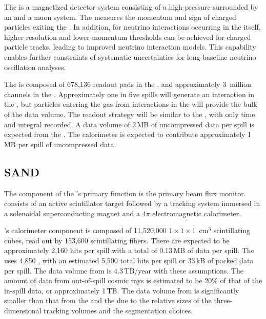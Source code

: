 \documentclass[../main-v1.tex]{subfiles}
\begin{document}
The  is a magnetized detector system consisting of a high-pressure  surrounded by an  and a muon system. The  measures the momentum and sign of charged particles exiting the . In addition, for neutrino interactions occurring in the  itself, higher resolution and lower momentum thresholds can be achieved for charged particle tracks, leading to improved neutrino interaction models. This capability enables further constraints of systematic uncertainties for long-baseline neutrino  oscillation analyses.

The  is composed of 678,136 readout pads in the , and approximately 3~million channels in the .  Approximately one in five spills will generate an interaction in the , but particles entering the gas from interactions in the  will provide the bulk of the data volume.  The readout strategy will be similar to the , with only time and integral recorded. A  data volume of 2\,MB of uncompressed data per spill is expected from the .  The calorimeter is expected to contribute approximately 1\,MB per spill of uncompressed data.


\subsection{SAND }
\label{sec:comp-dataestimates-sand}

The  component of the 's primary function is the primary beam flux monitor.    consists of an active scintillator target  followed by a tracking system immersed in a solenoidal superconducting magnet  and  a $4\pi$ electromagnetic calorimeter.


's  calorimeter component is composed of 11,520,000 $1\times 1\times 1$~cm$^3$ scintillating cubes, read out by 153,600 scintillating fibers.  There are expected to be approximately 2,160 hits per spill with a total of 0.13\,MB of data per spill.  The  ~\cite{Adinolfi:2002zx} uses 4,850 , with an estimated 5,500 total hits per spill or 33\,kB of packed data per spill.   The data volume from  is 4.3\,TB/year with these assumptions.  The amount of data from out-of-spill cosmic rays is estimated to be 20\% of that of the in-spill data, or approximately 1\,TB.  The data volume from  is significantly smaller than that from the  and the  due to the relative sizes of the three-dimensional tracking volumes and the segmentation choices.
\end{document}
